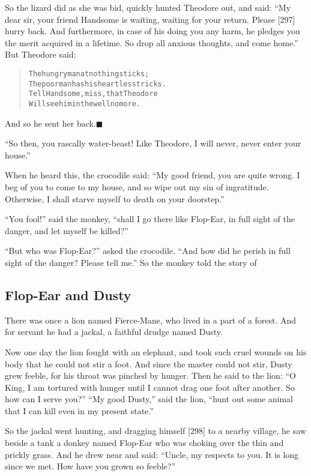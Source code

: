 \documentclass[article, twoside, 14pt]{memoir}
\newcommand{\qed}{\hfill \ensuremath{\blacksquare}}
\renewenvironment{verbatim}{%
\begin{quote}%
\vskip -10pt%
\begin{alltt}\normalfont\large}{\end{alltt}%
\end{quote}%
\vskip -10pt
} %
\begin{document}
So the lizard did as she was bid, quickly hunted Theodore out, and
said:
``My dear sir, your friend Handsome is waiting, waiting for your return. Please [297] hurry back. And furthermore, in case of his doing you any harm, he pledges you the merit acquired in a lifetime. So drop all anxious thoughts, and come home.''
But Theodore said:

\begin{verbatim}
The hungry man at nothing sticks;
The poor man has his heartless tricks.
Tell Handsome, miss, that Theodore
Will see him in the well no more.
\end{verbatim}
And so he sent her back.\hyperref[s67]{\qed}

``So then, you rascally water-beast! Like Theodore, I will never, never enter your house.''

When he heard this, the crocodile said:
``My good friend, you are quite wrong. I beg of you to come to my house, and so wipe out my sin of ingratitude. Otherwise, I shall starve myself to death on your doorstep.''

``You fool!'' said the monkey,
``shall I go there like Flop-Ear, in full sight of the danger, and let myself be killed?''

``But who was Flop-Ear?'' asked the crocodile.
``And how did he perish in full sight of the danger? Please tell me.''
So the monkey told the story of

\subsection{Flop-Ear and Dusty}

\label{s68}

There was once a lion named Fierce-Mane, who lived in a part of a
forest. And for servant he had a jackal, a faithful drudge named
Dusty.

Now one day the lion fought with an elephant, and took such cruel
wounds on his body that he could not stir a foot. And since the
master could not stir, Dusty grew feeble, for his throat was
pinched by hunger. Then he said to the lion:
``O King, I am tortured with hunger until I cannot drag one foot after another. So how can I serve you?''
``My good Dusty,'' said the lion,
``hunt out some animal that I can kill even in my present state.''

So the jackal went hunting, and dragging himself [298] to a nearby
village, he saw beside a tank a donkey named Flop-Ear who was
choking over the thin and prickly grass. And he drew near and said:
``Uncle, my respects to you. It is long since we met. How have you grown so feeble?''
\end{document}
